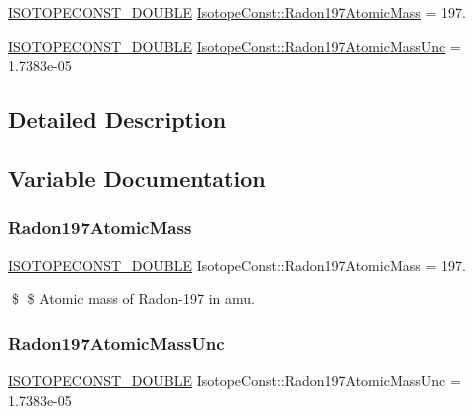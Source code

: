 \begin{DoxyCompactItemize}
\item 
\mbox{\hyperlink{group___isotope_const-_macros_ga8f45a7272ce02c0b4c65c44636ed719a}{I\+S\+O\+T\+O\+P\+E\+C\+O\+N\+S\+T\+\_\+\+D\+O\+U\+B\+LE}} \mbox{\hyperlink{group___isotope_const-_radon-_rn197_ga4aea624a855a692ababfc56ce7fd481e}{Isotope\+Const\+::\+Radon197\+Atomic\+Mass}} = 197.
\item 
\mbox{\hyperlink{group___isotope_const-_macros_ga8f45a7272ce02c0b4c65c44636ed719a}{I\+S\+O\+T\+O\+P\+E\+C\+O\+N\+S\+T\+\_\+\+D\+O\+U\+B\+LE}} \mbox{\hyperlink{group___isotope_const-_radon-_rn197_gaf1512b528f07c13dca5105b0c3ec6708}{Isotope\+Const\+::\+Radon197\+Atomic\+Mass\+Unc}} = 1.\+7383e-\/05
\end{DoxyCompactItemize}


\subsection{Detailed Description}


\subsection{Variable Documentation}
\mbox{\label{group___isotope_const-_radon-_rn197_ga4aea624a855a692ababfc56ce7fd481e}} 
\subsubsection{\texorpdfstring{Radon197\+Atomic\+Mass}{Radon197AtomicMass}}
{\footnotesize\ttfamily \mbox{\hyperlink{group___isotope_const-_macros_ga8f45a7272ce02c0b4c65c44636ed719a}{I\+S\+O\+T\+O\+P\+E\+C\+O\+N\+S\+T\+\_\+\+D\+O\+U\+B\+LE}} Isotope\+Const\+::\+Radon197\+Atomic\+Mass = 197.}

\$ \$ Atomic mass of Radon-\/197 in amu. \mbox{\label{group___isotope_const-_radon-_rn197_gaf1512b528f07c13dca5105b0c3ec6708}} 
\subsubsection{\texorpdfstring{Radon197\+Atomic\+Mass\+Unc}{Radon197AtomicMassUnc}}
{\footnotesize\ttfamily \mbox{\hyperlink{group___isotope_const-_macros_ga8f45a7272ce02c0b4c65c44636ed719a}{I\+S\+O\+T\+O\+P\+E\+C\+O\+N\+S\+T\+\_\+\+D\+O\+U\+B\+LE}} Isotope\+Const\+::\+Radon197\+Atomic\+Mass\+Unc = 1.\+7383e-\/05}

